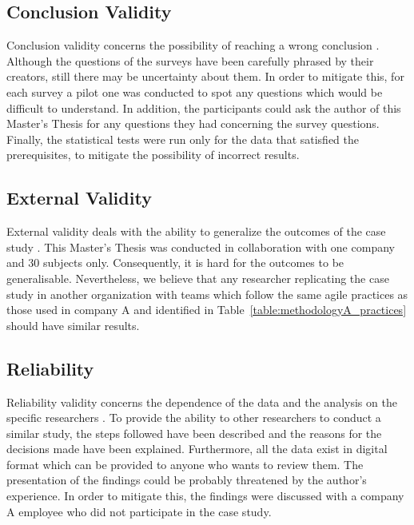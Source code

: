 \subsection{Conclusion Validity}
Conclusion validity concerns the possibility of reaching a wrong conclusion \cite{Wohlin}. Although the questions of the surveys have been carefully phrased by their creators, still there may be uncertainty about them. In order to mitigate this, for each survey a pilot one was conducted to spot any questions which would be difficult to understand. In addition, the participants could ask the author of this Master's Thesis for any questions they had concerning the survey questions. Finally, the statistical tests were run only for the data that satisfied the prerequisites, to mitigate the possibility of incorrect results. %

\subsection{External Validity}
External validity deals with the ability to generalize the outcomes of the case study \cite{Wohlin}. This Master's Thesis was conducted in collaboration with one company and 30 subjects only. Consequently, it is hard for the outcomes to be generalisable. Nevertheless, we believe that any researcher replicating the case study in another organization with teams which follow the same agile practices as those used in company A and identified in Table~\ref{table:methodologyA_practices} should have similar results.

\subsection{Reliability}
Reliability validity concerns the dependence of the data and the analysis on the specific researchers \cite{Wohlin}. To provide the ability to other researchers to conduct a similar study, the steps followed have been described and the reasons for the decisions made have been explained. Furthermore, all the data exist in digital format which can be provided to anyone who wants to review them. The presentation of the findings could be probably threatened by the author's experience. In order to mitigate this, the findings were discussed with a company A employee who did not participate in the case study.






